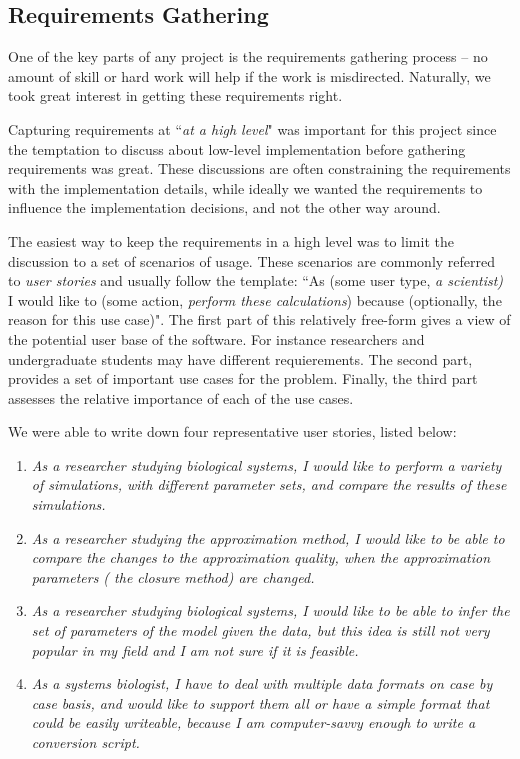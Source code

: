 \subsection{Requirements Gathering}
One of the key parts of any project is the requirements gathering process -- no amount of skill or hard work will help if the work is misdirected.
Naturally, we took great interest in getting these requirements right.

Capturing requirements at ``\emph{at a high level}" was important for this project since the temptation to discuss about low-level implementation before gathering requirements was great.
These discussions are often constraining the requirements with the implementation details, while ideally we wanted the requirements to influence the implementation decisions, and not the other way around.

The easiest way to keep the requirements in a high level was to limit the discussion to a set of scenarios of usage.
These scenarios are commonly referred to \emph{user stories} and usually follow the template: ``As (some user type, \eg{} \emph{a scientist)} I would like to (some action, \eg{} \emph{perform these calculations}) because (optionally, the reason for this use case)".
The first part of this relatively free-form gives a view of the potential user base of the software.
For instance researchers and undergraduate students may have different requierements.
The second part, provides a set of important use cases for the problem.
Finally, the third part assesses the relative importance of each of the use cases.

We were able to write down four representative user stories, listed below:
\begin{enumerate}

    \item \emph{As a researcher studying biological systems, I would like to perform a variety of simulations, with different parameter sets, and compare the results of these simulations.}

    \item \emph{As a researcher studying the approximation method, I would like to be able to compare the changes to the approximation quality, when the approximation parameters (\ie{} the closure method) are changed.}

    \item \emph{As a researcher studying biological systems, I would like to be able to infer the set of parameters of the model given the data, but this idea is still not very popular in my field and I am not sure if it is feasible.}

    \item \emph{As a systems biologist, I have to deal with multiple data formats on case by case basis, and would like to support them all or have a simple format that could be easily writeable, because I am computer-savvy enough to write a conversion script.}
\end{enumerate}


